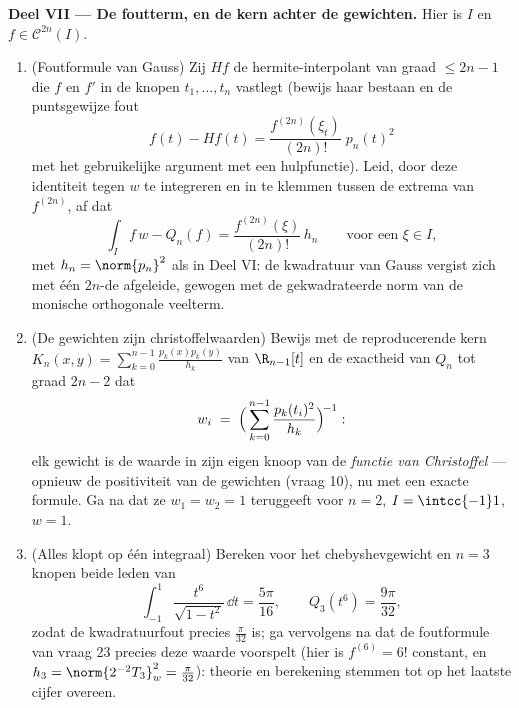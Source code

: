 \begin{problem}
\medskip
\noindent\textbf{Deel VII --- De foutterm, en de kern achter de
gewichten.} Hier is $I$  en $f \in \mathcal C^{2n}(I)$.
\begin{enumerate}[resume]
  \item (Foutformule van Gauss) Zij $Hf$ de
        hermite-interpolant van graad $\leq 2n - 1$ die $f$ en
        $f'$ in de knopen $t_1, \dots, t_n$ vastlegt (bewijs
        haar bestaan en de puntsgewijze fout
        \[
        f(t) - Hf(t) =
        \frac{f^{(2n)}(\xi_t)}{(2n)!}\;p_n(t)^2
        \]
        met het gebruikelijke argument met een hulpfunctie).
        Leid, door deze identiteit tegen $w$ te integreren en in
        te klemmen tussen de extrema van $f^{(2n)}$, af dat
        \[
        \int_I f\,w - Q_n(f)
        = \frac{f^{(2n)}(\xi)}{(2n)!}\,h_n
        \qquad\text{voor een } \xi \in I,
        \]
        met $h_n = \norm{p_n}^2$ als in Deel VI: de kwadratuur
        van Gauss vergist zich met één $2n$-de afgeleide,
        gewogen met de gekwadrateerde norm van de monische
        orthogonale veelterm.
  \item (De gewichten zijn christoffelwaarden) Bewijs met de
        reproducerende kern $K_n(x, y) = \sum_{k=0}^{n-1}
        \frac{p_k(x)p_k(y)}{h_k}$ van $\R_{n-1}[t]$ en de
        exactheid van $Q_n$ tot graad $2n - 2$ dat
        \[
        w_i \;=\;
        \Bigl(\,\sum_{k=0}^{n-1}
        \frac{p_k(t_i)^2}{h_k}\Bigr)^{\!-1} :
        \]
        elk gewicht is de waarde in zijn eigen knoop van de
        \emph{functie van Christoffel} --- opnieuw de
        positiviteit van de gewichten (vraag 10), nu met een
        exacte formule. Ga na dat ze $w_1 = w_2 = 1$ teruggeeft
        voor $n = 2$, $I = \intcc{-1}1$, $w = 1$.
  \item (Alles klopt op één integraal) Bereken voor het
        chebyshevgewicht en $n = 3$ knopen beide leden van
        \[
        \int_{-1}^{1}\frac{t^6}{\sqrt{1 - t^2}}\,\dd t
        = \frac{5\pi}{16},
        \qquad
        Q_3(t^6) = \frac{9\pi}{32},
        \]
        zodat de kwadratuurfout precies $\frac{\pi}{32}$ is; ga
        vervolgens na dat de foutformule van vraag 23 precies
        deze waarde voorspelt (hier is $f^{(6)} = 6!$ constant,
        en $h_3 = \norm{2^{-2}T_3}_w^2 = \frac\pi{32}$): theorie
        en berekening stemmen tot op het laatste cijfer overeen.
\end{enumerate}
\end{problem}
